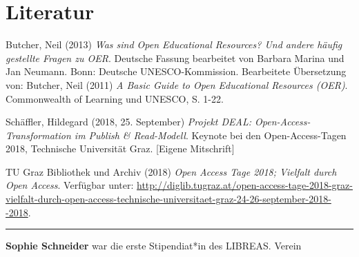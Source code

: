 \documentclass[a4paper,
fontsize=11pt,
oneside,
numbers=noperiodatend,
parskip=half-,
bibliography=totoc,
final
]{scrartcl}
\begin{document}
\hypertarget{literatur}{%
\section{Literatur}\label{literatur}}

Butcher, Neil (2013) \emph{Was sind Open Educational Resources? Und
andere häufig gestellte Fragen zu OER}. Deutsche Fassung bearbeitet von
Barbara Marina und Jan Neumann. Bonn: Deutsche UNESCO-Kommission.
Bearbeitete Übersetzung von: Butcher, Neil (2011) \emph{A Basic Guide to
Open Educational Resources (OER)}. Commonwealth of Learning und UNESCO,
S. 1-22.

Schäffler, Hildegard (2018, 25. September) \emph{Projekt DEAL:
Open-Access-Transformation im Publish \& Read-Modell}. Keynote bei den
Open-Access-Tagen 2018, Technische Universität Graz. {[}Eigene
Mitschrift{]}

TU Graz Bibliothek und Archiv (2018) \emph{Open Access Tage 2018;
Vielfalt durch Open Access}. Verfügbar unter:
\url{http://diglib.tugraz.at/open-access-tage-2018-graz-vielfalt-durch-open-access-technische-universitaet-graz-24-26-september-2018--2018}.

\begin{center}\rule{0.5\linewidth}{\linethickness}\end{center}

\textbf{Sophie Schneider} war die erste Stipendiat*in des LIBREAS.
Verein
\end{document}
